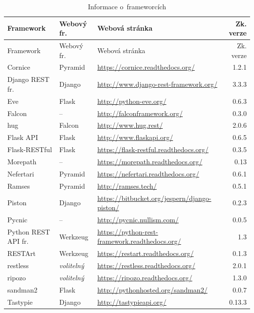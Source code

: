 \begin{landscape}
\begin{longtable}[]{@{}lllr@{}}

\caption{Informace o~frameworcích \label{tab:informace}}\tabularnewline
\toprule
Framework & Webový fr. & Webová stránka & Zk. verze\tabularnewline
\midrule
\endfirsthead
\toprule
Framework & Webový fr. & Webová stránka & Zk. verze\tabularnewline
\midrule
\endhead
Cornice & Pyramid & \url{https://cornice.readthedocs.org/} & 1.2.1\tabularnewline
Django REST fr. & Django & \url{http://www.django-rest-framework.org/} & 3.3.3\tabularnewline
Eve & Flask & \url{http://python-eve.org/} & 0.6.3\tabularnewline
Falcon & -- & \url{http://falconframework.org/} & 0.3.0\tabularnewline
hug & Falcon & \url{http://www.hug.rest/} & 2.0.6\tabularnewline
Flask API & Flask & \url{http://www.flaskapi.org/} & 0.6.5\tabularnewline
Flask-RESTful & Flask & \url{https://flask-restful.readthedocs.org/} & 0.3.5\tabularnewline
Morepath & -- & \url{https://morepath.readthedocs.org/} & 0.13\tabularnewline
Nefertari & Pyramid & \url{https://nefertari.readthedocs.org/} & 0.6.1\tabularnewline
Ramses & Pyramid & \url{http://ramses.tech/} & 0.5.1\tabularnewline
Piston & Django & \url{https://bitbucket.org/jespern/django-piston/} & 0.2.3\tabularnewline
Pycnic & -- & \url{http://pycnic.nullism.com/} & 0.0.5\tabularnewline
Python REST API fr. & Werkzeug & \url{https://python-rest-framework.readthedocs.org/} & 1.3\tabularnewline
RESTArt & Werkzeug & \url{https://restart.readthedocs.org/} & 0.1.3\tabularnewline
restless & \emph{volitelný} & \url{https://restless.readthedocs.org/} & 2.0.1\tabularnewline
ripozo & \emph{volitelný} & \url{https://ripozo.readthedocs.org/} & 1.3.0\tabularnewline
sandman2 & Flask & \url{http://pythonhosted.org/sandman2/} & 0.0.7\tabularnewline
Tastypie & Django & \url{http://tastypieapi.org/} & 0.13.3\tabularnewline
\bottomrule
\end{longtable}
\end{landscape}
